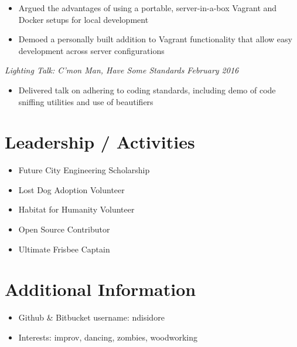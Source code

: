 \documentclass[10pt]{article}
\begin{document}
\vspace{-1em}
\begin{itemize}
  \item Argued the advantages of using a portable, server-in-a-box Vagrant and Docker setups for local development
  \item Demoed a personally built addition to Vagrant functionality that allow easy development across server configurations
\end{itemize}
\textit{Lighting Talk: C'mon Man, Have Some Standards \hfill February 2016} \\
\vspace{-1em}
\begin{itemize}
  \item Delivered talk on adhering to coding standards, including demo of code sniffing utilities and use of beautifiers
\end{itemize}

\section*{Leadership / Activities}
\begin{multicols}{2}
  \begin{itemize}
    \item Future City Engineering Scholarship
    \item Lost Dog Adoption Volunteer
    \item Habitat for Humanity Volunteer
    \item Open Source Contributor
    \item Ultimate Frisbee Captain
  \end{itemize}
\end{multicols}

\section*{Additional Information}
\begin{multicols}{2}
  \begin{itemize}
    \item Github \& Bitbucket username: ndisidore
    \item Interests: improv, dancing, zombies, woodworking
  \end{itemize}
\end{multicols}
\end{document}

